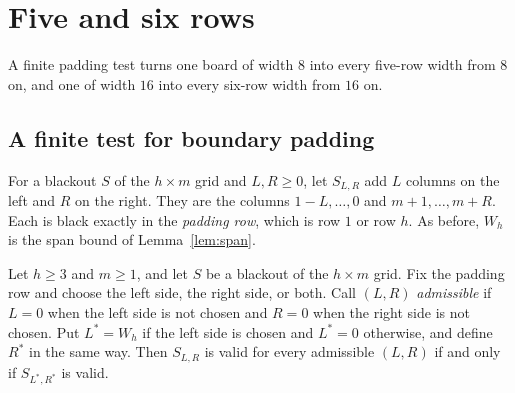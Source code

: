 \section{Five and six rows}\label{sec:five}

A finite padding test turns one board of width $8$ into every five-row width from $8$ on,
and one of width $16$ into every six-row width from $16$ on.

\subsection{A finite test for boundary padding}

For a blackout $S$ of the $h\times m$ grid and $L,R\ge0$, let $S_{L,R}$ add $L$ columns on
the left and $R$ on the right. They are the columns $1-L,\dots,0$ and $m+1,\dots,m+R$. Each
is black exactly in the \emph{padding row}, which is row $1$ or row $h$. As before, $W_h$ is
the span bound of Lemma~\ref{lem:span}.


\begin{theorem}\label{thm:collar}
Let $h\ge3$ and $m\ge1$, and let $S$ be a blackout of the $h\times m$ grid. Fix the padding
row and choose the left side, the right side, or both. Call $(L,R)$ \emph{admissible} if
$L=0$ when the left side is not chosen and $R=0$ when the right side is not chosen. Put
$L^*=W_h$ if the left side is chosen and $L^*=0$ otherwise, and define $R^*$ in the same
way. Then $S_{L,R}$ is valid for every admissible $(L,R)$ if and only if $S_{L^*,R^*}$ is
valid.
\end{theorem}

